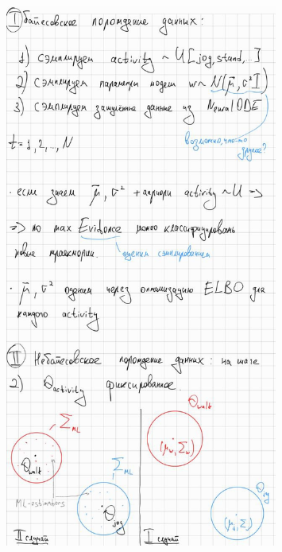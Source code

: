 \documentclass[referee, pdflatex, sn-mathphys-num]{sn-jnl}
\theoremstyle{definition}
\theoremstyle{plain}
\begin{document}
	\begin{figure}[h]
		\centering
		\includegraphics[width=0.8\textwidth]{imgs/photo_1_2024-12-13_23-46-45}
	\end{figure}
	
\end{document}

